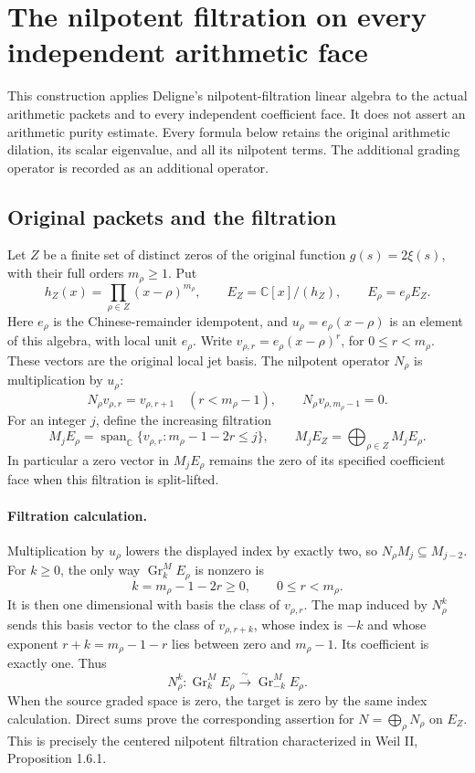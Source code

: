 \section{The nilpotent filtration on every independent arithmetic face}
\label{sec:mixed-face-monodromy}

This construction applies Deligne's nilpotent-filtration linear algebra to the
actual arithmetic packets and to every independent coefficient face. It does
not assert an arithmetic purity estimate. Every formula below retains the
original arithmetic dilation, its scalar eigenvalue, and all its nilpotent
terms. The additional grading operator is recorded as an additional operator.

\subsection{Original packets and the filtration}

Let \(Z\) be a finite set of distinct zeros of the original function
\(g(s)=2\xi(s)\), with their full orders \(m_\rho\geq1\). Put
\[
 h_Z(x)=\prod_{\rho\in Z}(x-\rho)^{m_\rho},\qquad
 E_Z=\mathbb C[x]/(h_Z),\qquad
 E_\rho=e_\rho E_Z.
 \tag{MW1}
\]
Here \(e_\rho\) is the Chinese-remainder idempotent, and
\(u_\rho=e_\rho(x-\rho)\) is an element of this algebra, with local unit
\(e_\rho\). Write \(v_{\rho,r}=e_\rho(x-\rho)^r\), for
\(0\leq r<m_\rho\). These vectors are the original local jet basis.
The nilpotent operator \(N_\rho\) is multiplication by \(u_\rho\):
\[
 N_\rho v_{\rho,r}=v_{\rho,r+1}\quad(r<m_\rho-1),\qquad
 N_\rho v_{\rho,m_\rho-1}=0.
 \tag{MW2}
\]
For an integer \(j\), define the increasing filtration
\[
 M_jE_\rho
 =\operatorname{span}_{\mathbb C}
   \{v_{\rho,r}:m_\rho-1-2r\leq j\},\qquad
 M_jE_Z=\bigoplus_{\rho\in Z}M_jE_\rho .
 \tag{MW3}
\]
In particular a zero vector in \(M_jE_\rho\) remains the zero of its specified
coefficient face when this filtration is split-lifted.

\paragraph{Filtration calculation.}
Multiplication by \(u_\rho\) lowers the displayed index by exactly two,
so \(N_\rho M_j\subseteq M_{j-2}\). For \(k\geq0\), the only way
\(\operatorname{Gr}_k^M E_\rho\) is nonzero is
\[
 k=m_\rho-1-2r\geq0,\qquad 0\leq r<m_\rho .
\]
It is then one dimensional with basis the class of \(v_{\rho,r}\).
The map induced by \(N_\rho^k\) sends this basis vector to the class of
\(v_{\rho,r+k}\), whose index is \(-k\) and whose exponent
\(r+k=m_\rho-1-r\) lies between zero and \(m_\rho-1\).
Its coefficient is exactly one. Thus
\[
 N_\rho^k:\operatorname{Gr}_k^M E_\rho
       \xrightarrow{\;\sim\;}\operatorname{Gr}_{-k}^M E_\rho .
 \tag{MW4}
\]
When the source graded space is zero, the target is zero by the same
index calculation. Direct sums prove the corresponding assertion for
\(N=\bigoplus_\rho N_\rho\) on \(E_Z\).
This is precisely the centered nilpotent filtration characterized in
Weil II, Proposition 1.6.1.

